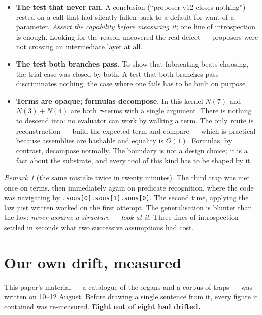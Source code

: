 \documentclass[11pt]{article}
\theoremstyle{remark}\newtheorem{remark}{Remark}
\begin{document}
\begin{itemize}\itemsep2pt
\item \textbf{The test that never ran.} A conclusion (``proposer v12 closes nothing'')
rested on a call that had silently fallen back to a default for want of a parameter.
\emph{Assert the capability before measuring it}; one line of introspection is enough.
Looking for the reason uncovered the real defect --- proposers were not crossing an
intermediate layer at all.
\item \textbf{The test both branches pass.} To show that fabricating beats choosing, the
trial case was closed by both. A test that both branches pass discriminates nothing; the
case where one fails has to be built on purpose.
\item \textbf{Terms are opaque; formulas decompose.} In this kernel $N(7)$ and
$N(3)+N(4)$ are both $\tau$-terms with a single argument. There is nothing to descend
into: no evaluator can work by walking a term. The only route is reconstruction ---
build the expected term and compare --- which is practical because assemblies are
hashable and equality is $O(1)$. Formulas, by contrast, decompose normally. The boundary
is not a design choice; it is a fact about the substrate, and every tool of this kind has
to be shaped by it.
\end{itemize}

\begin{remark}[the same mistake twice in twenty minutes]
The third trap was met once on terms, then immediately again on predicate recognition,
where the code was navigating by \texttt{.sous[0].sous[1].sous[0]}. The second time,
applying the law just written worked on the first attempt. The generalisation is blunter
than the law: \emph{never assume a structure --- look at it}. Three lines of
introspection settled in seconds what two successive assumptions had cost.
\end{remark}

\section{Our own drift, measured}
\label{sec:drift}

This paper's material --- a catalogue of the organs and a corpus of traps --- was written
on 10--12 August. Before drawing a single sentence from it, every figure it contained was
re-measured. \textbf{Eight out of eight had drifted.}
\end{document}
